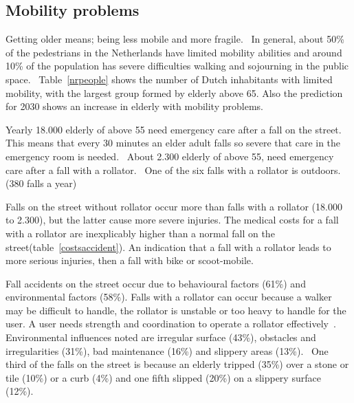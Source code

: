 \subsection{Mobility problems}
Getting older means; being less mobile and more fragile.~\cite{VeiligheidNL2012} In general, about 50\% of the pedestrians in the Netherlands have limited mobility abilities and around 10\% of the population has severe difficulties walking and sojourning in the public space.~\cite{Sauter2010} Table~\ref{nrpeople} shows the number of Dutch inhabitants with limited mobility, with the largest group formed by elderly above 65. Also the prediction for 2030 shows an increase in elderly with mobility problems.~\cite{Sauter2010} 

Yearly 18.000 elderly of above 55 need emergency care after a fall on the street. This means that every 30 minutes an elder adult falls so severe that care in the emergency room is needed.~\cite{VeiligheidNL2012} About 2.300 elderly of above 55, need emergency care after a fall with a rollator.~\cite{VeiligheidNL2012} One of the six falls with a rollator is outdoors. (380 falls a year)~\cite{VeiligheidNL2012}

Falls on the street without rollator occur more than falls with a rollator (18.000 to 2.300), but the latter cause more severe injuries. The medical costs for a fall with a rollator are inexplicably higher than a normal fall on the street(table~\ref{costsaccident}). An indication that a fall with a rollator leads to more serious injuries, then a fall with bike or scoot-mobile.~\cite{VeiligheidNL2012}

Fall accidents on the street occur due to behavioural factors (61\%) and environmental factors (58\%). Falls with a rollator can occur because a walker may be difficult to handle, the rollator is unstable or too heavy to handle for the user. A user needs strength and coordination to operate a rollator effectively~\cite{Einbinder2010, Weiss2014}. Environmental influences noted are irregular surface (43\%), obstacles and irregularities (31\%), bad maintenance (16\%) and slippery areas (13\%).~\cite{VeiligheidNL2012} One third of the falls on the street is because an elderly tripped (35\%) over a stone or tile (10\%) or a curb (4\%) and one fifth slipped (20\%) on a slippery surface (12\%).~\cite{VeiligheidNL2012} 

\renewcommand{\arraystretch}{1.5}

